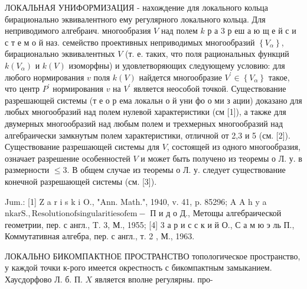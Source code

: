 \documentclass[10pt]{article}
\begin{document}
ЛОКАЛЬНАЯ УНИФОРМИЗАЦИЯ - нахождение для локального кольца бирационально эквивалентного ему регулярного локального кольца. Для неприводимого алгебраич. многообразия $V$ над полем $k$ р а 3 р еш а ю щ е й с и с т е м о й наз. семейство проективных неприводимых многообразий $\left\{V_{\alpha}\right\}$, бирационально эквивалентных $V$ (т. е. таких, что поля рациональных функций $k\left(V_{\alpha}\right)$ и $k(V)$ изоморфны) и удовлетворяющих следующему условию: для любого нормирования $v$ поля $k(V)$ найдется многообразие $V^{\prime} \in\left\{V_{\alpha}\right\}$ такое, что центр $P^{\prime}$ нормирования $v$ на $V^{\prime}$ является неособой точкой. Существование разрешающей системы (т е о р ема локальн о й уни фо о ми з ации) доказано для любых многообразий над полем нулевой характеристики (см [1]), а также для двумерных многообразий над любым полем и трехмерных многообразий над алгебраически замкнутым полем характеристики, отличной от 2,3 и 5 (см. [2]). Существование разрешающей системы для $V$, состоящей из одного многообразия, означает разрешение особенностей $V$ и может быть получено из теоремы о Л. у. в размерности $\leqslant 3$. В общем случае из теоремы о Л. у. следует существование конечной разрешающей системы (см. [3]).



Jum.: [1] Z a r i s k i O., "Ann. Math.", 1940, v. 41, p. 85296; A A h y a $\mathrm{n} \mathrm{k} \mathrm{a} \mathrm{r} \mathrm{S.,} \mathrm{Resolution} \mathrm{of} \mathrm{singularities} \mathrm{of} \mathrm{em-}$ П и д о Д., Метощы алгебраической геометрии, пер. с англ., T. 3, М., 1955; [4] 3 а р и с с к и й О., С а м ю э ль П., Коммутативная алгебра, пер. с англ., т. 2 , М., 1963.



ЛОКАЛЬНО БИКОМПАКТНОЕ ПРОСТРАНСТВО топологическое пространство, у каждой точки к-рого имеется окрестность с бикомпактным замыканием. Хаусдорфово Л. б. П. $X$ является вполне регулярны. про-
\end{document}
